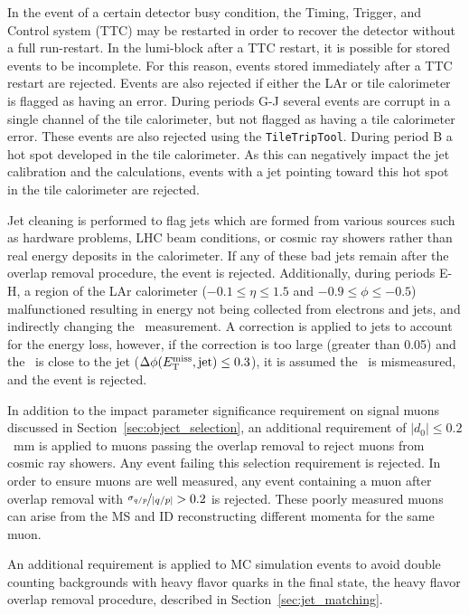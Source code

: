 In the event of a certain detector busy condition, the Timing, Trigger, and
Control system (TTC) may be restarted in order to recover the detector without
a full run-restart.
In the lumi-block after a TTC restart, it is possible for stored events to be
incomplete.
For this reason, events stored immediately after a TTC restart are rejected.
Events are also rejected if either the LAr or tile calorimeter is
flagged as having an error.
During periods G-J several events are corrupt in a single channel of the tile
calorimeter, but not flagged as having a tile calorimeter error.
These events are also rejected using the \texttt{TileTripTool}.
During period B a hot spot developed in the tile calorimeter.
As this can negatively impact the jet calibration and the \met calculations,
events with a jet pointing toward this hot spot in the tile calorimeter are
rejected.

Jet cleaning is performed to flag jets which are formed from various sources
such as hardware problems, LHC beam conditions, or cosmic ray showers rather
than real energy deposits in the calorimeter.
If any of these bad jets remain after the overlap removal procedure, the event
is rejected.
Additionally, during periods E-H, a region of the LAr
calorimeter ($-0.1\le\eta\le1.5$ and $-0.9\le\phi\le-0.5$) malfunctioned
resulting in energy not being collected from electrons and jets, and
indirectly changing the \met\ measurement.
A correction is applied to jets to account for the energy loss,
however, if the correction is too large (greater than 0.05) and the \met\ is
close to the jet ($\Delta\phi(E_{\mathrm{T}}^{\mathrm{miss}}, \text{jet}) \le 0.3$), it is assumed the
\met\ is mismeasured, and the event is rejected.

In addition to the impact parameter significance requirement on signal muons
discussed in Section~\ref{sec:object_selection}, an additional requirement of
$|d_0| \leq 0.2$~mm is applied to muons passing the overlap removal to reject
muons from cosmic ray showers. Any event failing this selection requirement is
rejected.
In order to ensure muons are well measured, any event containing a muon after
overlap removal with $\nicefrac{\sigma_{q/p}}{|q/p|} > 0.2$ is rejected.
These poorly measured muons can arise from the MS and ID reconstructing
different momenta for the same muon.

An additional requirement is applied to MC simulation events to avoid double
counting backgrounds with heavy flavor quarks in the final state, the heavy
flavor overlap removal procedure, described in Section~\ref{sec:jet_matching}.

